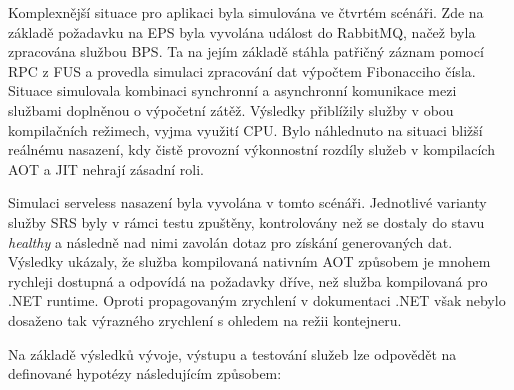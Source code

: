 Komplexnější situace pro aplikaci byla simulována ve čtvrtém scénáři. Zde na základě požadavku na EPS byla vyvolána událost do RabbitMQ, načež byla zpracována službou BPS. Ta na jejím základě stáhla patřičný záznam pomocí RPC z FUS a provedla simulaci zpracování dat výpočtem Fibonacciho čísla. Situace simulovala kombinaci synchronní a asynchronní komunikace mezi službami doplněnou o výpočetní zátěž. Výsledky přiblížily služby v obou kompilačních režimech, vyjma využití CPU. Bylo náhlednuto na situaci bližší reálnému nasazení, kdy čistě provozní výkonnostní rozdíly služeb v kompilacích AOT a JIT nehrají zásadní roli. 



Simulaci serveless nasazení byla vyvolána v tomto scénáři. Jednotlivé varianty služby SRS byly v rámci testu zpuštěny, kontrolovány než se dostaly do stavu \emph{healthy} a následně nad nimi zavolán dotaz pro získání generovaných dat. Výsledky ukázaly, že služba kompilovaná nativním AOT způsobem je mnohem rychleji dostupná a odpovídá na požadavky dříve, než služba kompilovaná pro .NET runtime. Oproti propagovaným zrychlení v dokumentaci .NET však nebylo dosaženo tak výrazného zrychlení s ohledem na režii kontejneru.



Na základě výsledků vývoje, výstupu a testování služeb lze odpovědět na definované hypotézy následujícím způsobem:

